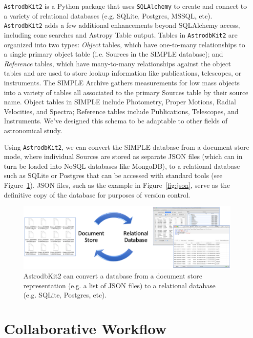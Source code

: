 \documentclass[11pt,twoside]{article}
\begin{document}
 \texttt{AstrodbKit2} is a Python package that uses \texttt{SQLAlchemy} to create and connect to a variety of relational databases (e.g. SQLite, Postgres, MSSQL, etc). 
 \texttt{AstrodbKit2} adds a few additional enhancements beyond SQLAlchemy access, including cone searches and Astropy Table output.
 Tables in \texttt{AstrodbKit2} are organized into two types: \textit{Object} tables, which have one-to-many relationships to a single primary object table (i.e. Sources in the SIMPLE database); and \textit{Reference} tables, which have many-to-many relationships against the object tables and are used to store lookup information like publications, telescopes, or instruments. The SIMPLE Archive gathers measurements for low mass objects into a variety of tables all associated to the primary Sources table by their source name. Object tables in SIMPLE include Photometry, Proper Motions, Radial Velocities, and Spectra; Reference tables include Publications, Telescopes, and Instruments.
 We've designed this schema to be adaptable to other fields of astronomical study.

Using \texttt{AstrodbKit2}, we can convert the SIMPLE database from a document store mode, where individual Sources are stored as separate JSON files (which can in turn be loaded into NoSQL databases like MongoDB), to a relational database such as SQLite or Postgres that can be accessed with standard tools (see Figure~\ref{fig:astrodbkit2}). JSON files, such as the example in Figure~\ref{fig:json}, serve as the definitive copy of the database for purposes of version control.

\begin{figure}
    \centering
    \includegraphics[width=\textwidth]{X0-012_f1.eps}
    \caption{AstrodbKit2 can convert a database from a document store representation (e.g. a list of JSON files) to a relational database (e.g. SQLite, Postgres, etc).}
    \label{fig:astrodbkit2}
\end{figure}

\section{Collaborative Workflow}
\end{document}
